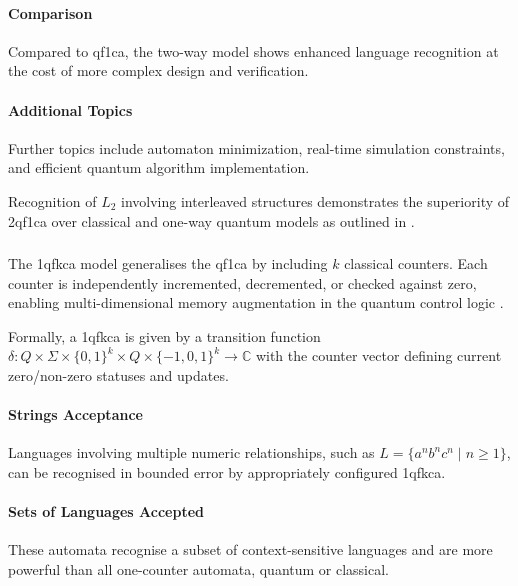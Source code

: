 \paragraph{Comparison}
Compared to \gls{qf1ca}, the two-way model shows enhanced language recognition at the cost of more complex design and verification.

\paragraph{Additional Topics}
Further topics include automaton minimization, real-time simulation constraints, and efficient quantum algorithm implementation.

\begin{example}
Recognition of $L_2$ involving interleaved structures demonstrates the superiority of \gls{2qf1ca} over classical and one-way quantum models as outlined in \cite{bonner2001quantum}.
\end{example}

\subsubsection{}

The \gls{1qfkca} model generalises the \gls{qf1ca} by including $k$ classical counters. Each counter is independently incremented, decremented, or checked against zero, enabling multi-dimensional memory augmentation in the quantum control logic \cite{cem2012quantum}.

\begin{definition}
Formally, a \gls{1qfkca} is given by a transition function $\delta: Q \times \Sigma \times \{0,1\}^k \times Q \times \{-1,0,1\}^k \rightarrow \mathbb{C}$ with the counter vector defining current zero/non-zero statuses and updates.
\end{definition}

\paragraph{Strings Acceptance}
Languages involving multiple numeric relationships, such as $L = \{ a^n b^n c^n \mid n \geq 1 \}$, can be recognised in bounded error by appropriately configured \gls{1qfkca}.

\paragraph{Sets of Languages Accepted}
These automata recognise a subset of context-sensitive languages and are more powerful than all one-counter automata, quantum or classical.


